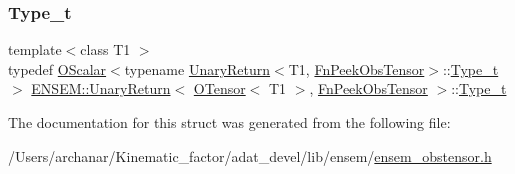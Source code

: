 \subsubsection{\texorpdfstring{Type\_t}{Type\_t}\hspace{0.1cm}{\footnotesize\ttfamily [2/2]}}
{\footnotesize\ttfamily template$<$class T1 $>$ \\
typedef \mbox{\hyperlink{classENSEM_1_1OScalar}{O\+Scalar}}$<$typename \mbox{\hyperlink{structENSEM_1_1UnaryReturn}{Unary\+Return}}$<$T1, \mbox{\hyperlink{structENSEM_1_1FnPeekObsTensor}{Fn\+Peek\+Obs\+Tensor}}$>$\+::\mbox{\hyperlink{structENSEM_1_1UnaryReturn_3_01OTensor_3_01T1_01_4_00_01FnPeekObsTensor_01_4_abefeb4103abe844c4b6cbc2df22fd844}{Type\+\_\+t}}$>$ \mbox{\hyperlink{structENSEM_1_1UnaryReturn}{E\+N\+S\+E\+M\+::\+Unary\+Return}}$<$ \mbox{\hyperlink{classENSEM_1_1OTensor}{O\+Tensor}}$<$ T1 $>$, \mbox{\hyperlink{structENSEM_1_1FnPeekObsTensor}{Fn\+Peek\+Obs\+Tensor}} $>$\+::\mbox{\hyperlink{structENSEM_1_1UnaryReturn_3_01OTensor_3_01T1_01_4_00_01FnPeekObsTensor_01_4_abefeb4103abe844c4b6cbc2df22fd844}{Type\+\_\+t}}}



The documentation for this struct was generated from the following file\+:\begin{DoxyCompactItemize}
\item 
/\+Users/archanar/\+Kinematic\+\_\+factor/adat\+\_\+devel/lib/ensem/\mbox{\hyperlink{lib_2ensem_2ensem__obstensor_8h}{ensem\+\_\+obstensor.\+h}}\end{DoxyCompactItemize}
